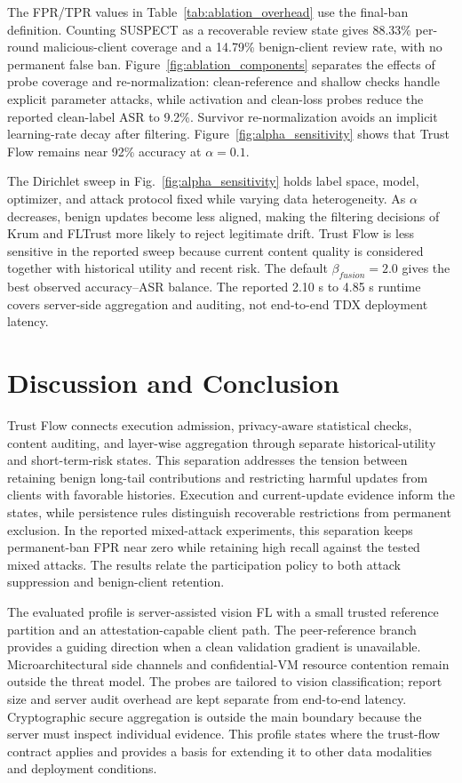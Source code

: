 \documentclass[conference,compsoc]{IEEEtran}
\begin{document}
The FPR/TPR values in Table~\ref{tab:ablation_overhead} use the final-ban definition. Counting SUSPECT as a recoverable review state gives 88.33\% per-round malicious-client coverage and a 14.79\% benign-client review rate, with no permanent false ban. Figure~\ref{fig:ablation_components} separates the effects of probe coverage and re-normalization: clean-reference and shallow checks handle explicit parameter attacks, while activation and clean-loss probes reduce the reported clean-label ASR to 9.2\%. Survivor re-normalization avoids an implicit learning-rate decay after filtering. Figure~\ref{fig:alpha_sensitivity} shows that Trust Flow remains near 92\% accuracy at $\alpha=0.1$.

The Dirichlet sweep in Fig.~\ref{fig:alpha_sensitivity} holds label space, model, optimizer, and attack protocol fixed while varying data heterogeneity. As $\alpha$ decreases, benign updates become less aligned, making the filtering decisions of Krum and FLTrust more likely to reject legitimate drift. Trust Flow is less sensitive in the reported sweep because current content quality is considered together with historical utility and recent risk. The default $\beta_{fusion}=2.0$ gives the best observed accuracy--ASR balance. The reported 2.10 s to 4.85 s runtime covers server-side aggregation and auditing, not end-to-end TDX deployment latency.

\FloatBarrier %

\section{Discussion and Conclusion}

Trust Flow connects execution admission, privacy-aware statistical checks, content auditing, and layer-wise aggregation through separate historical-utility and short-term-risk states. This separation addresses the tension between retaining benign long-tail contributions and restricting harmful updates from clients with favorable histories. Execution and current-update evidence inform the states, while persistence rules distinguish recoverable restrictions from permanent exclusion. In the reported mixed-attack experiments, this separation keeps permanent-ban FPR near zero while retaining high recall against the tested mixed attacks. The results relate the participation policy to both attack suppression and benign-client retention.

The evaluated profile is server-assisted vision FL with a small trusted reference partition and an attestation-capable client path. The peer-reference branch provides a guiding direction when a clean validation gradient is unavailable. Microarchitectural side channels and confidential-VM resource contention remain outside the threat model. The probes are tailored to vision classification; report size and server audit overhead are kept separate from end-to-end latency. Cryptographic secure aggregation is outside the main boundary because the server must inspect individual evidence. This profile states where the trust-flow contract applies and provides a basis for extending it to other data modalities and deployment conditions.

\FloatBarrier %



\end{document}

